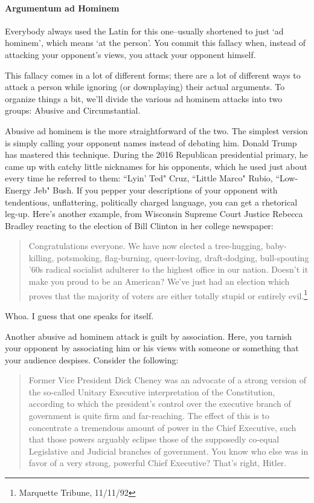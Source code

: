 \paragraph{Argumentum ad Hominem}
Everybody always used the Latin for this one--usually shortened to just `ad hominem', which
means `at the person'. You commit this fallacy when, instead of attacking your opponent's views,
you attack your opponent himself.

This fallacy comes in a lot of different forms; there are a lot of different ways to attack a person
while ignoring (or downplaying) their actual arguments. To organize things a bit, we'll divide the
various ad hominem attacks into two groups: Abusive and Circumstantial.

Abusive ad hominem is the more straightforward of the two. The simplest version is simply calling
your opponent names instead of debating him. Donald Trump has mastered this technique. During
the 2016 Republican presidential primary, he came up with catchy little nicknames for his
opponents, which he used just about every time he referred to them: ``Lyin' Ted" Cruz, ``Little
Marco" Rubio, ``Low-Energy Jeb" Bush. If you pepper your descriptions of your opponent with
tendentious, unflattering, politically charged language, you can get a rhetorical leg-up. Here's
another example, from Wisconsin Supreme Court Justice Rebecca Bradley reacting to the election
of Bill Clinton in her college newspaper:

\begin{quote}
Congratulations everyone. We have now elected a tree-hugging, baby-killing, potsmoking, flag-burning, queer-loving, draft-dodging, bull-spouting '60s radical socialist
adulterer to the highest office in our nation. Doesn't it make you proud to be an American?
We've just had an election which proves that the majority of voters are either totally stupid
or entirely evil.\footnote{Marquette Tribune, 11/11/92}
\end{quote}

Whoa. I guess that one speaks for itself.

Another abusive ad hominem attack is guilt by association. Here, you tarnish your opponent by
associating him or his views with someone or something that your audience despises. Consider the
following:

\begin{quote}
Former Vice President Dick Cheney was an advocate of a strong version of the so-called
Unitary Executive interpretation of the Constitution, according to which the president's
control over the executive branch of government is quite firm and far-reaching. The effect
of this is to concentrate a tremendous amount of power in the Chief Executive, such that
those powers arguably eclipse those of the supposedly co-equal Legislative and Judicial
branches of government. You know who else was in favor of a very strong, powerful Chief
Executive? That's right, Hitler.
\end{quote}


